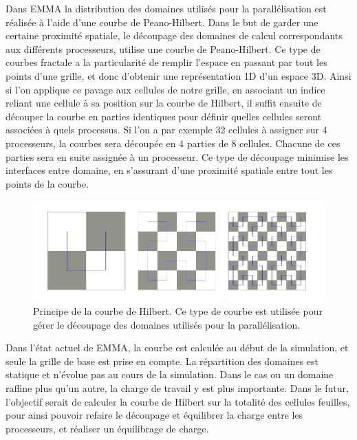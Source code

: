 Dans EMMA la distribution des domaines utilisés pour la parallélisation est réalisée à l'aide d'une courbe de Peano-Hilbert.
Dans le but de garder une certaine proximité spatiale, le découpage des domaines de calcul correspondants aux différents processeurs, utilise une courbe de Peano-Hilbert.
Ce type de courbes fractale a la particularité de remplir l'espace en passant par tout les points d'une grille, et donc d'obtenir une représentation 1D d'un espace 3D.
Ainsi si l'on applique ce pavage aux cellules de notre grille, en associant un indice reliant une cellule à sa position sur la courbe de Hilbert, il suffit ensuite de découper la courbe en parties identiques pour définir quelles cellules seront associées à quels processus.
Si l'on a par exemple 32 cellules à assigner sur 4 processeurs, la courbes sera découpée en 4 parties de 8 cellules.
Chacune de ces parties sera en suite assignée à un processeur.
Ce type de découpage minimise les interfaces entre domaine, en s'assurant d'une proximité spatiale entre tout les points de la courbe.

\begin{figure}
        \includegraphics[width=.95\linewidth]{img/02/courbe_Hilbert.jpeg} 
        \caption[Courbe de Hilbert]{Principe de la courbe de Hilbert.
        Ce type de courbe est utilisée pour gérer le découpage des domaines utilisés pour la parallélisation.
 		\label{fig:hilbert}}
\end{figure}

%

Dans l'état actuel de EMMA, la courbe est calculée au début de la simulation, et seule la grille de base est prise en compte.
La répartition des domaines est statique et n'évolue pas au cours de la simulation.
Dans le cas ou un domaine raffine plus qu'un autre, la charge de travail y est plus importante.
Dans le futur, l'objectif serait de calculer la courbe de Hilbert sur la totalité des cellules feuilles, pour ainsi pouvoir refaire le découpage et équilibrer la charge entre les processeurs, et réaliser un équilibrage de charge.

